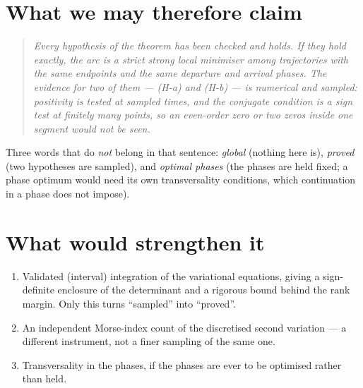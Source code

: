 \documentclass[11pt]{article}
\begin{document}
\section{What we may therefore claim}
\begin{quote}
\emph{Every hypothesis of the theorem has been checked and holds. If they hold
exactly, the arc is a strict strong local minimiser among trajectories with
the same endpoints and the same departure and arrival phases. The evidence for
two of them --- (H-a) and (H-b) --- is numerical and sampled: positivity is
tested at sampled times, and the conjugate condition is a sign test at
finitely many points, so an even-order zero or two zeros inside one segment
would not be seen.}
\end{quote}
Three words that do \emph{not} belong in that sentence: \emph{global}
(nothing here is), \emph{proved} (two hypotheses are sampled), and
\emph{optimal phases} (the phases are held fixed; a phase optimum would need
its own transversality conditions, which continuation in a phase does not
impose).

\section{What would strengthen it}
\begin{enumerate}
\item Validated (interval) integration of the variational equations, giving a
sign-definite enclosure of the determinant and a rigorous bound behind the
rank margin. Only this turns ``sampled'' into ``proved''.
\item An independent Morse-index count of the discretised second variation ---
a different instrument, not a finer sampling of the same one.
\item Transversality in the phases, if the phases are ever to be optimised
rather than held.
\end{enumerate}
\end{document}

